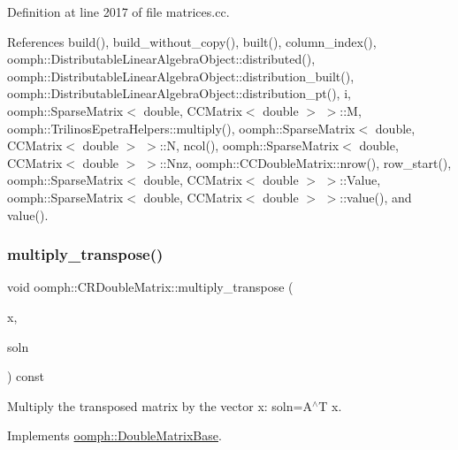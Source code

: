 Definition at line 2017 of file matrices.\+cc.



References build(), build\+\_\+without\+\_\+copy(), built(), column\+\_\+index(), oomph\+::\+Distributable\+Linear\+Algebra\+Object\+::distributed(), oomph\+::\+Distributable\+Linear\+Algebra\+Object\+::distribution\+\_\+built(), oomph\+::\+Distributable\+Linear\+Algebra\+Object\+::distribution\+\_\+pt(), i, oomph\+::\+Sparse\+Matrix$<$ double, C\+C\+Matrix$<$ double $>$ $>$\+::M, oomph\+::\+Trilinos\+Epetra\+Helpers\+::multiply(), oomph\+::\+Sparse\+Matrix$<$ double, C\+C\+Matrix$<$ double $>$ $>$\+::N, ncol(), oomph\+::\+Sparse\+Matrix$<$ double, C\+C\+Matrix$<$ double $>$ $>$\+::\+Nnz, oomph\+::\+C\+C\+Double\+Matrix\+::nrow(), row\+\_\+start(), oomph\+::\+Sparse\+Matrix$<$ double, C\+C\+Matrix$<$ double $>$ $>$\+::\+Value, oomph\+::\+Sparse\+Matrix$<$ double, C\+C\+Matrix$<$ double $>$ $>$\+::value(), and value().

\mbox{\label{classoomph_1_1CRDoubleMatrix_a42fb274c98ccf4c2a542ca15343fcc0e}} 
\subsubsection{\texorpdfstring{multiply\+\_\+transpose()}{multiply\_transpose()}}
{\footnotesize\ttfamily void oomph\+::\+C\+R\+Double\+Matrix\+::multiply\+\_\+transpose (\begin{DoxyParamCaption}\item[{const \hyperlink{classoomph_1_1DoubleVector}{Double\+Vector} \&}]{x,  }\item[{\hyperlink{classoomph_1_1DoubleVector}{Double\+Vector} \&}]{soln }\end{DoxyParamCaption}) const\hspace{0.3cm}{\ttfamily [virtual]}}



Multiply the transposed matrix by the vector x\+: soln=A$^\wedge$T x. 



Implements \hyperlink{classoomph_1_1DoubleMatrixBase_a843d44405b70da1d96b43218a21e6ffc}{oomph\+::\+Double\+Matrix\+Base}.



